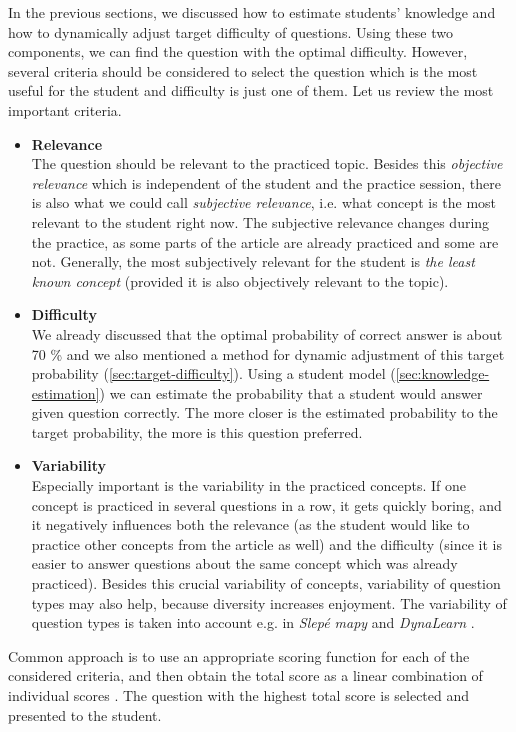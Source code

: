 \documentclass[12pt, twoside]{fithesis2}
\renewcommand{\_}{\leavevmode \kern0.07em\vbox{\hrule width0.4em}}
\newcommand{\squarebullet}{\textcolor{black}{\raisebox{0.15em}{\rule{4pt}{4pt}}}}
\newcommand{\emptysquarebullet}{\textcolor{black}{\raisebox{0.10em}{\tiny$\square$}}}
\newenvironment{myItemize}{
  \begin{itemize}[leftmargin=2em,rightmargin=1em,itemsep=\parskip ,parsep=0em,topsep=0em,partopsep=0em]
  \renewcommand{\labelitemi}{\squarebullet}
  \renewcommand{\labelitemii}{\textbullet}
}{
  \end{itemize}
}
\begin{document}
In the previous sections, we discussed how to estimate students' knowledge and how to dynamically adjust target difficulty of questions.
Using these two components, we can find the question with the optimal difficulty.
However, several criteria should be considered to select the question which is the most useful for the student and difficulty is just one of them. Let us review the most important criteria.
\begin{myItemize}
  \item \textbf{Relevance}\\
    The question should be relevant to the practiced topic.
    Besides this \emph{objective relevance} which is independent of the student and the practice session,
    there is also what we could call \emph{subjective relevance}, i.e. what concept is the most relevant to the student right now.
    The subjective relevance changes during the practice, as some parts of the article are already practiced and some are not.
    Generally, the most subjectively relevant for the student is
    \emph{the least known concept} \cite{question-gen-adapt-bayes}
    (provided it is also objectively relevant to the topic).

  \item \textbf{Difficulty}\\
    We already discussed that the optimal probability of correct answer is about 70 \% and we also mentioned a method for dynamic adjustment of this target probability (\autoref{sec:target-difficulty}).
    Using a student model (\autoref{sec:knowledge-estimation}) we can estimate the probability that a student would answer given question correctly.
    The more closer is the estimated probability to the target probability, the more is this question preferred.

  \item \textbf{Variability}\\
    Especially important is the variability in the practiced concepts.
    If one concept is practiced in several questions in a row, it gets quickly boring, and it negatively influences both the relevance (as the student would like to practice other concepts from the article as well) and the difficulty (since it is easier to answer questions about the same concept which was already practiced).
    Besides this crucial variability of concepts,
    variability of question types may also help, because diversity increases enjoyment.
    The variability of question types is taken into account e.g. in \emph{Slepé mapy} \cite{slepe-mapy} and \emph{DynaLearn} \cite{question-gen-adapt-bayes}.
\end{myItemize}
Common approach is to use an appropriate scoring function for each of the considered criteria, and then obtain the total score as a linear combination of individual scores \cite{slepe-mapy}.
The question with the highest total score is selected and presented to the student.
\end{document}
